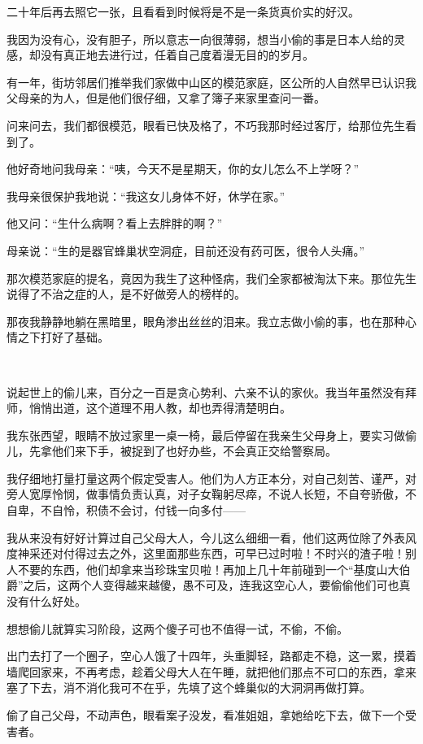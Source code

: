 \par 二十年后再去照它一张，且看看到时候将是不是一条货真价实的好汉。
\par 我因为没有心，没有胆子，所以意志一向很薄弱，想当小偷的事是日本人给的灵感，却没有真正地去进行过，任着自己度着漫无目的的岁月。
\par 有一年，街坊邻居们推举我们家做中山区的模范家庭，区公所的人自然早已认识我父母亲的为人，但是他们很仔细，又拿了簿子来家里查问一番。
\par 问来问去，我们都很模范，眼看已快及格了，不巧我那时经过客厅，给那位先生看到了。
\par 他好奇地问我母亲：“咦，今天不是星期天，你的女儿怎么不上学呀？”
\par 我母亲很保护我地说：“我这女儿身体不好，休学在家。”
\par 他又问：“生什么病啊？看上去胖胖的啊？”
\par 母亲说：“生的是器官蜂巢状空洞症，目前还没有药可医，很令人头痛。”
\par 那次模范家庭的提名，竟因为我生了这种怪病，我们全家都被淘汰下来。那位先生说得了不治之症的人，是不好做旁人的榜样的。
\par 那夜我静静地躺在黑暗里，眼角渗出丝丝的泪来。我立志做小偷的事，也在那种心情之下打好了基础。
\par  
\par 说起世上的偷儿来，百分之一百是贪心势利、六亲不认的家伙。我当年虽然没有拜师，悄悄出道，这个道理不用人教，却也弄得清楚明白。
\par 我东张西望，眼睛不放过家里一桌一椅，最后停留在我亲生父母身上，要实习做偷儿，先拿他们来下手，被捉到了也好办些，不会真正交给警察局。
\par 我仔细地打量打量这两个假定受害人。他们为人方正本分，对自己刻苦、谨严，对旁人宽厚怜悯，做事情负责认真，对子女鞠躬尽瘁，不说人长短，不自夸骄傲，不自卑，不自怜，积债不会讨，付钱一向多付——
\par 我从来没有好好计算过自己父母大人，今儿这么细细一看，他们这两位除了外表风度神采还对付得过去之外，这里面那些东西，可早已过时啦！不时兴的渣子啦！别人不要的东西，他们却拿来当珍珠宝贝啦！再加上几十年前碰到一个“基度山大伯爵”之后，这两个人变得越来越傻，愚不可及，连我这空心人，要偷偷他们可也真没有什么好处。
\par 想想偷儿就算实习阶段，这两个傻子可也不值得一试，不偷，不偷。
\par 出门去打了一个圈子，空心人饿了十四年，头重脚轻，路都走不稳，这一累，摸着墙爬回家来，不再考虑，趁着父母大人在午睡，就把他们那点不可口的东西，拿来塞了下去，消不消化我可不在乎，先填了这个蜂巢似的大洞洞再做打算。
\par 偷了自己父母，不动声色，眼看案子没发，看准姐姐，拿她给吃下去，做下一个受害者。
